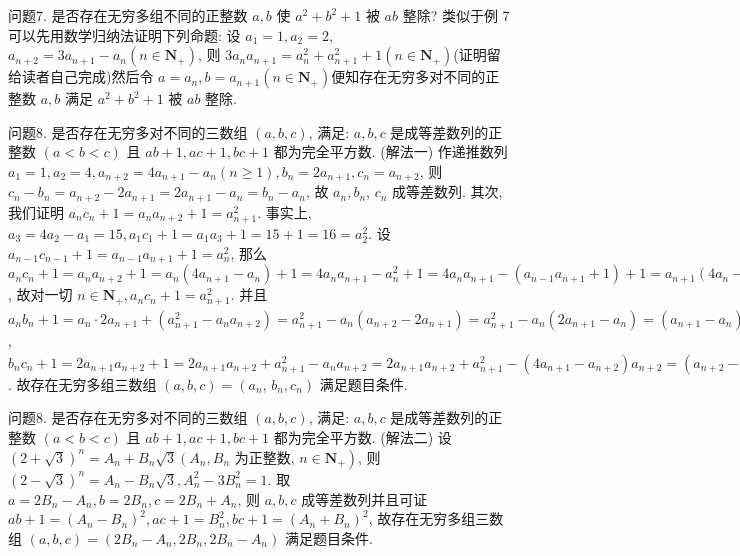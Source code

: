 问题7. 是否存在无穷多组不同的正整数 $a, b$ 使 $a^2+b^2+1$ 被 $a b$ 整除?
类似于例 7 可以先用数学归纳法证明下列命题: 设 $a_1=1, a_2=2$, $a_{n+2}=3 a_{n+1}-a_n\left(n \in \mathbf{N}_{+}\right)$, 则 $3 a_n a_{n+1}=a_n^2+a_{n+1}^2+1\left(n \in \mathbf{N}_{+}\right)$(证明留给读者自己完成)然后令 $a=a_n, b=a_{n+1}\left(n \in \mathbf{N}_{+}\right)$便知存在无穷多对不同的正整数 $a, b$ 满足 $a^2+b^2+1$ 被 $a b$ 整除.



问题8. 是否存在无穷多对不同的三数组 $(a, b, c)$, 满足: $a, b, c$ 是成等差数列的正整数 $(a<b<c)$ 且 $a b+1, a c+1, b c+1$ 都为完全平方数.
(解法一) 作递推数列 $a_1=1, a_2=4, a_{n+2}=4 a_{n+1}-a_n(n \geqslant 1), b_n= 2 a_{n+1}, c_n=a_{n+2}$, 则 $c_n-b_n=a_{n+2}-2 a_{n+1}=2 a_{n+1}-a_n=b_n-a_n$, 故 $a_n, b_n$, $c_n$ 成等差数列.
其次, 我们证明 $a_n c_n+1=a_n a_{n+2}+1=a_{n+1}^2$. 事实上, $a_3= 4 a_2-a_1=15, a_1 c_1+1=a_1 a_3+1=15+1=16=a_2^2$. 设 $a_{n-1} c_{n-1}+1= a_{n-1} a_{n+1}+1=a_n^2$, 那么 $a_n c_n+1=a_n a_{n+2}+1=a_n\left(4 a_{n+1}-a_n\right)+1= 4 a_n a_{n+1}-a_n^2+1=4 a_n a_{n+1}-\left(a_{n-1} a_{n+1}+1\right)+1=a_{n+1}\left(4 a_n-a_{n-1}\right)=a_{n+1}^2$, 故对一切 $n \in \mathbf{N}_{+}, a_n c_n+1=a_{n+1}^2$. 并且 $a_n b_n+1=a_n \cdot 2 a_{n+1}+\left(a_{n+1}^2-\right. \left.a_n a_{n+2}\right)=a_{n+1}^2-a_n\left(a_{n+2}-2 a_{n+1}\right)=a_{n+1}^2-a_n\left(2 a_{n+1}-a_n\right)=\left(a_{n+1}-a_n\right)^2$, $b_n c_n+1=2 a_{n+1} a_{n+2}+1=2 a_{n+1} a_{n+2}+a_{n+1}^2-a_n a_{n+2}=2 a_{n+1} a_{n+2}+a_{n+1}^2- \left(4 a_{n+1}-a_{n+2}\right) a_{n+2}=\left(a_{n+2}-a_{n+1}\right)^2$. 故存在无穷多组三数组 $(a, b, c)=\left(a_n\right.$, $\left.b_n, c_n\right)$ 满足题目条件.



问题8. 是否存在无穷多对不同的三数组 $(a, b, c)$, 满足: $a, b, c$ 是成等差数列的正整数 $(a<b<c)$ 且 $a b+1, a c+1, b c+1$ 都为完全平方数.
(解法二) 设 $(2+\sqrt{3})^n=A_n+B_n \sqrt{3}\left(A_n, B_n\right.$ 为正整数, $\left.n \in \mathbf{N}_{+}\right)$, 则 $(2- \sqrt{3})^n=A_n-B_n \sqrt{3}, A_n^2-3 B_n^2=1$. 取 $a=2 B_n-A_n, b=2 B_n, c=2 B_n+A_n$, 则 $a, b, c$ 成等差数列并且可证 $a b+1=\left(A_n-B_n\right)^2, a c+1=B_n^2, b c+1= \left(A_n+B_n\right)^2$, 故存在无穷多组三数组 $(a, b, c)=\left(2 B_n-A_n, 2 B_n, 2 B_n-A_n\right)$ 满足题目条件.



